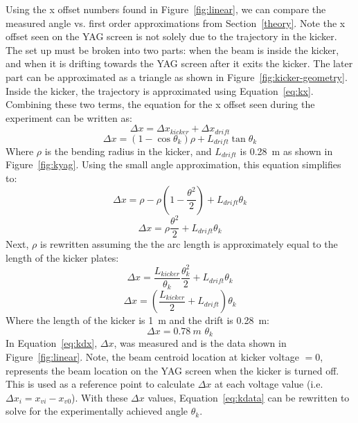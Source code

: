 Using the x offset numbers found in Figure~\ref{fig:linear}, 
we can compare the measured angle vs. first order approximations from Section~\ref{theory}. 
Note the x offset seen on the YAG screen is not solely due to the trajectory in the kicker.
The set up must be broken into two parts: when the beam is inside the kicker, 
and when it is drifting towards the YAG screen after it exits the kicker.
The later part can be approximated as a triangle as shown in Figure~\ref{fig:kicker-geometry}.
Inside the kicker, the trajectory is approximated using Equation~\ref{eq:kx}. 
Combining these two terms, the equation for the x offset seen during the experiment
can be written as:
\begin{equation}
	\Delta x = \Delta x_{kicker} + \Delta x_{drift}
\end{equation}
\begin{equation}
	\Delta x = \left(1-\cos\theta_{k}\right)\rho + L_{drift} \tan \theta_{k}
	\label{eq:kdata}
\end{equation}
Where $\rho$ is the bending radius in the kicker, and $L_{drift}$ is \SI{0.28}{m} as shown in Figure~\ref{fig:kyag}.
Using the small angle approximation, this equation simplifies to:
\begin{equation}
	\Delta x = \rho - \rho \left(1-\frac{\theta^2}{2}\right) + L_{drift} \theta_{k}
\end{equation}
\begin{equation}
	\Delta x = \rho \frac{\theta^2}{2} + L_{drift} \theta_{k}
\end{equation}
Next, $\rho$ is rewritten assuming the the arc length is approximately equal 
to the length of the kicker plates:
\begin{equation}
	\Delta x = \frac{L_{kicker}}{\theta_{k}}\frac{\theta_{k}^2}{2} + L_{drift}\theta_{k}
\end{equation}
\begin{equation}
	\Delta x = \left(\frac{L_{kicker}}{2}+ L_{drift}\right)\theta_{k}
\end{equation}
Where the length of the kicker is \SI{1}{m} and the drift is \SI{0.28}{m}:
\begin{equation}
	\Delta x = \SI{0.78}{m}\,\,\theta_{k}
		\label{eq:kdx}
\end{equation}
In Equation~\ref{eq:kdx}, $\Delta x$, was measured and is the data shown in Figure~\ref{fig:linear}. 
Note, the beam centroid location at kicker voltage $=0$, 
represents the beam location on the YAG screen when the kicker is turned off.
This is used as a reference point to calculate $\Delta x$ at each voltage value
(i.e. $\Delta x_i = x_{vi} - x_{v0}$).
With these $\Delta x$ values, Equation~\ref{eq:kdata} can be rewritten to 
solve for the experimentally achieved angle $\theta_{k}$.

